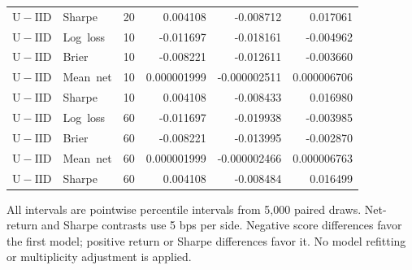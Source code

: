 \begin{longtable}{llrrrr}
\mbox{$\mathrm{U}-\mathrm{IID}$} & \mbox{Sharpe} & 20 & 0.004108 & -0.008712 & 0.017061\\
\mbox{$\mathrm{U}-\mathrm{IID}$} & \mbox{Log loss} & 10 & -0.011697 & -0.018161 & -0.004962\\
\mbox{$\mathrm{U}-\mathrm{IID}$} & \mbox{Brier} & 10 & -0.008221 & -0.012611 & -0.003660\\
\mbox{$\mathrm{U}-\mathrm{IID}$} & \mbox{Mean net} & 10 & 0.000001999 & -0.000002511 & 0.000006706\\
\mbox{$\mathrm{U}-\mathrm{IID}$} & \mbox{Sharpe} & 10 & 0.004108 & -0.008433 & 0.016980\\
\mbox{$\mathrm{U}-\mathrm{IID}$} & \mbox{Log loss} & 60 & -0.011697 & -0.019938 & -0.003985\\
\mbox{$\mathrm{U}-\mathrm{IID}$} & \mbox{Brier} & 60 & -0.008221 & -0.013995 & -0.002870\\
\mbox{$\mathrm{U}-\mathrm{IID}$} & \mbox{Mean net} & 60 & 0.000001999 & -0.000002466 & 0.000006763\\
\mbox{$\mathrm{U}-\mathrm{IID}$} & \mbox{Sharpe} & 60 & 0.004108 & -0.008484 & 0.016499\\
\bottomrule\end{longtable}\endgroup
All intervals are pointwise percentile intervals from 5,000 paired draws. Net-return and Sharpe contrasts use 5 bps per side. Negative score differences favor the first model; positive return or Sharpe differences favor it. No model refitting or multiplicity adjustment is applied.

\clearpage
